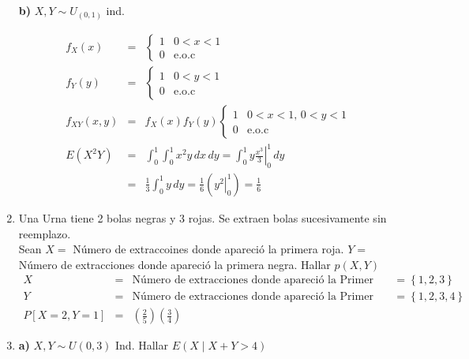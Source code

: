\begin{enumerate}
 \textbf{b)} $X, Y \sim U_{ \left(0,1 \right) }$ ind.
 
 \begin{eqnarray*}
 f_{X} \left(x \right) &=&
 \begin{cases}
 1 & 0<x<1 \\
 0 & \textrm{e.o.c}
 \end{cases}\\ 
  f_{Y} \left(y \right) &=&
 \begin{cases}
 1 & 0<y<1 \\
 0 & \textrm{e.o.c}
 \end{cases}\\ 
 f_{XY} \left(x,y \right)&=& f_{X} \left(x \right)f_{Y} \left(y \right)
 \begin{cases}
1 & 0<x<1 , \, 0<y<1 \\
 0 & \textrm{e.o.c}
 \end{cases}\\
 E \left(X^{2} Y \right)&=& \int_{0}^{1}\int_{0}^{1} x^{2} y \, dx \, dy = \left.\int_{0}^{1} y \frac{x^3}{3} \right|_{0}^{1} \, dy\\ &=&\frac{1}{3} \int_{0}^{1} y \, dy = \frac{1}{6} \left(\left.y^{2} \right|_{0}^{1}\right) = \frac{1}{6}
 \end{eqnarray*}
 \item Una Urna tiene 2 bolas negras y 3 rojas. Se extraen bolas sucesivamente sin reemplazo. \\
 Sean $X = $ Número de extraccoines donde apareció la primera roja. 
 $Y=$ Número de extracciones donde apareció la primera negra. 
 Hallar $p \left(X,Y \right)$
\begin{eqnarray*}
X &=& \textrm{Número de extracciones donde apareció la Primer bola roja.}= \left\{1,2,3 \right\}\\
Y &=& \textrm{Número de extracciones donde apareció la Primer bola negra.}= \left\{1,2,3,4 \right\}\\
P \left[X=2, Y=1 \right] &=& \left(\frac{2}{5}\right) \left(\frac{3}{4}\right)
\end{eqnarray*}  

\item 
\textbf{a)}  $X,Y \sim U \left(0,3 \right)$ Ind. Hallar $E \left(X \mid X+Y > 4 \right)$


\end{enumerate}
